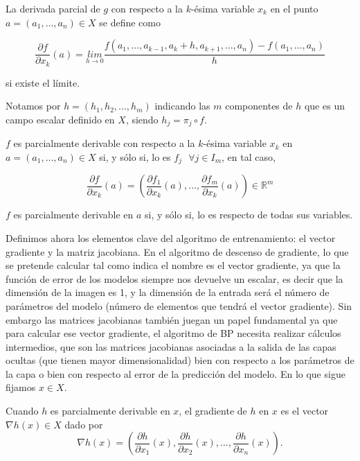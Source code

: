 \begin{definicion}
           

	La derivada parcial de $g$ con respecto a la $k$-ésima variable $x_k$ en el punto $a = (a_1, \ldots, a_n)\in X$ se define como

	$$ \frac{\partial f}{\partial x_k}(a) = \underset{h\rightarrow0}{lim}\frac{f(a_1, \ldots, a_{k-1}, a_k + h, a_{k+1}, \ldots, a_n) - f(a_1, \ldots, a_n)}{h}$$

	si existe el límite.
\end{definicion}

Notamos por $h= \left ( h_1,h_2,\ldots, h_m \right )$ indicando las $m$ componentes de $h$ que es un campo escalar definido en $X$, siendo $h_j=\pi _j \circ f$. 


\begin{definicion}
        $f$ es parcialmente derivable con respecto a la $k$-ésima variable $x_k$ en $a = (a_1, \ldots, a_n)\in X$ si, y sólo si, lo es $f_j \textrm{ } \forall j \in I_m$, en tal caso, 

        $$\frac{\partial f}{\partial x_k}(a) = \left ( \frac{\partial f_1}{\partial x_k}(a), \ldots, \frac{\partial f_m}{\partial x_k}(a) \right ) \in \mathbb{R}^m$$

        $f$ es parcialmente derivable en $a$ si, y sólo si, lo es respecto de todas sus variables.
\end{definicion}


Definimos ahora los elementos clave del algoritmo de entrenamiento: el vector gradiente y la matriz jacobiana. En el algoritmo de descenso de gradiente, lo que se pretende calcular tal como indica el nombre es el vector gradiente, ya que la función de error de los modelos siempre nos devuelve un escalar, es decir que la dimensión de la imagen es 1, y la dimensión de la entrada será el número de parámetros del modelo (número de elementos que tendrá el vector gradiente). Sin embargo las matrices jacobianas también juegan un papel fundamental ya que para calcular ese vector gradiente, el algoritmo de BP necesita realizar cálculos intermedios, que son las matrices jacobianas asociadas a la salida de las capas ocultas (que tienen mayor dimensionalidad) bien con respecto a los parámetros de la capa o bien con respecto al error de la predicción del modelo. En lo que sigue fijamos $x \in X$.

\begin{definicion}
    Cuando $h$ es parcialmente derivable en $x$, el gradiente de $h$ en $x$ es el vector $\nabla h(x) \in X$ dado por 
    $$\nabla h(x) = \left ( \frac{\partial h}{\partial x_1}(x), \frac{\partial h}{\partial x_2}(x), \ldots, \frac{\partial h}{\partial x_n}(x) \right ).$$
\end{definicion}


